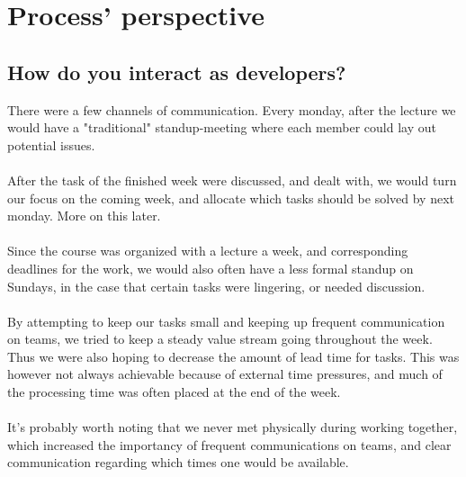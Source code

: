\section{Process' perspective}
\subsection{How do you interact as developers?} \label{Dev interaction}
There were a few channels of communication. Every monday, after the lecture we would have a "traditional" standup-meeting where each member could lay out potential issues.
\\\\
After the task of the finished week were discussed, and dealt with, we would turn our focus on the coming week, and allocate which tasks should be solved by next monday. More on this later.
\\\\
Since the course was organized with a lecture a week, and corresponding deadlines for the work, we would also often have a less formal standup on Sundays, in the case that certain tasks were lingering, or needed discussion.
\\\\
By attempting to keep our tasks small and keeping up frequent communication on teams, we tried to keep a steady value stream going throughout the week. Thus we were also hoping to decrease the amount of lead time for tasks. This was however not always achievable because of external time pressures, and much of the processing time was often placed at the end of the week.
\\\\
It's probably worth noting that we never met physically during working together, which increased the importancy of frequent communications on teams, and clear communication regarding which times one would be available.
